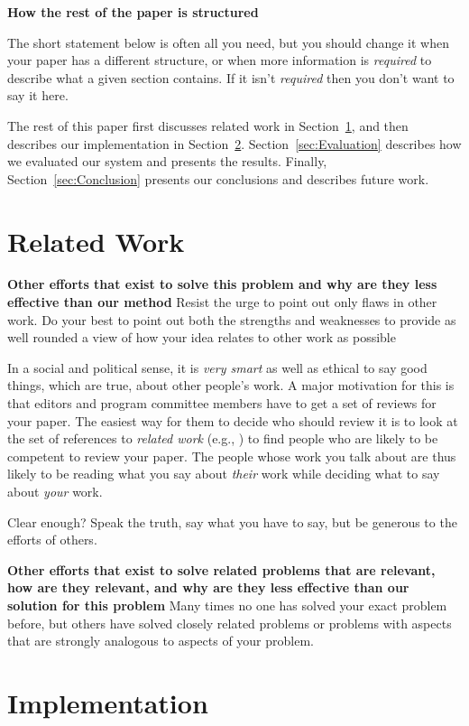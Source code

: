\documentclass[pdf,bookmarks,colorlinks=true]{IEEEtran}
\begin{document}
\textbf{How the rest of the paper is structured}

The short statement below is often all you need, but you should change it when your paper has a different structure, or when more information is {\em required} to describe what a given section contains. If it isn't {\em required} then you don't want to say it here.

The rest of this paper first discusses related work in Section~\ref{sec:RelatedWork}, and then describes our implementation in Section~\ref{sec:Implementation}. Section~\ref{sec:Evaluation} describes how we evaluated our system and presents the results. Finally, Section~\ref{sec:Conclusion} presents our conclusions and describes future work.

\section{Related Work}\label{sec:RelatedWork}

\textbf{Other efforts that exist to solve this problem and why are they less effective than our method} Resist the urge to point out only flaws in other work. Do your best to point out both the strengths and weaknesses to provide as well rounded a view of how your idea relates to other work as possible

In a social and political sense, it is {\em very smart} as well as ethical to say good things, which are true, about other people's work. A major motivation for this is that editors and program committee members have to get a set of reviews for your paper. The easiest way for them to decide who should review it is to look at the set of references to {\em related work} (e.g., \cite{Anderson2007,Anderson2009}) to find people who are likely to be competent to review your paper.  The people whose work you talk about are thus likely to be reading what you say about {\em their} work while deciding what to say about {\em your} work.

Clear enough? Speak the truth, say what you have to say, but be generous to the efforts of others.

\textbf{Other efforts that exist to solve related problems that are relevant, how are they relevant, and why are they less effective than our solution for this problem}
Many times no one has solved your exact problem before, but others have solved closely related problems or problems with aspects that are strongly analogous to aspects of your problem.

\section{Implementation}\label{sec:Implementation}
\end{document}
